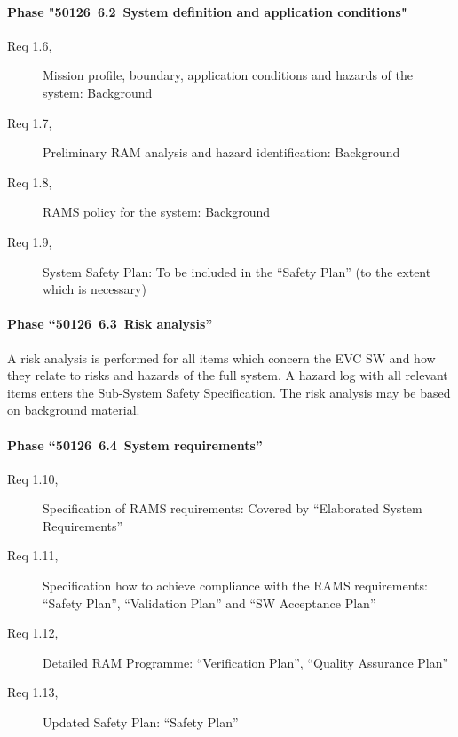 \documentclass{template/openetcs_article}
\begin{document}
\paragraph{Phase "50126~6.2~System definition and application conditions"}


\begin{description}
\item[Req 1.6, {\cite[6.2.3.1]{EN50126:1999}}] Mission profile,
  boundary, application conditions and hazards of the system:
  Background
\item[Req 1.7, {\cite[6.2.3.2]{EN50126:1999}}] Preliminary RAM
  analysis and hazard identification: Background
\item[Req 1.8, {\cite[6.2.3.3]{EN50126:1999}}] RAMS policy for the
  system: Background
\item[Req 1.9, {\cite[6.2.3.4]{EN50126:1999}}] System Safety Plan: To
  be included in the ``Safety Plan'' (to the extent which is
  necessary)
\end{description}

\paragraph{Phase ``50126~6.3~Risk analysis''}

A risk analysis is performed for all items which concern the EVC SW
and how they relate to risks and hazards of the full system. A hazard
log with all relevant items enters the Sub-System Safety
Specification. The risk analysis may be based on background material.

\paragraph{Phase ``50126~6.4~System requirements''}

\begin{description}
\item[Req 1.10, {\cite[6.4.3.1]{EN50126:1999}}] Specification of RAMS
  requirements: Covered by ``Elaborated System Requirements''
\item[Req 1.11, {\cite[6.4.3.2]{EN50126:1999}}] Specification how to
  achieve compliance with the RAMS requirements: ``Safety Plan'',
  ``Validation Plan'' and ``SW Acceptance Plan''
\item[Req 1.12, {\cite[6.4.3.3]{EN50126:1999}}] Detailed RAM
  Programme: ``Verification Plan'', ``Quality Assurance Plan''
\item[Req 1.13, {\cite[6.4.3.4]{EN50126:1999}}] Updated Safety Plan:
  ``Safety Plan''
\end{description}
\end{document}
